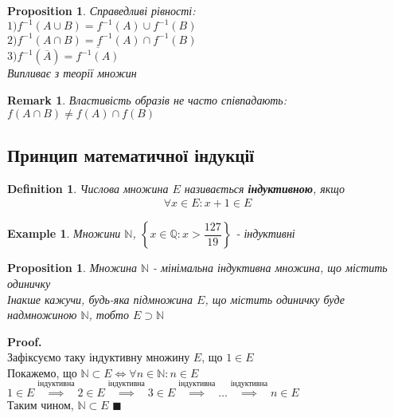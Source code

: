 \documentclass[a4paper, 14pt]{extarticle}
\theoremstyle{theoremdd}
\theoremstyle{theoremdd}
\newtheorem{definition}[theorem]{Definition}
\theoremstyle{theoremdd}
\theoremstyle{theoremdd}
\newtheorem{example}[theorem]{Example}
\theoremstyle{theoremdd}
\newtheorem{proposition}[theorem]{Proposition}
\theoremstyle{theoremdd}
\newtheorem{remark}[theorem]{Remark}
\theoremstyle{theoremdd}
\theoremstyle{theoremdd}
\newenvironment{pf}{\vspace*{-3mm} \textbf{Proof. \\}}{$\blacksquare$}
\begin{document}
\begin{proposition}
Справедливі рівності:\\
$1) f^{-1}(A \cup B) = f^{-1}(A) \cup f^{-1}(B)$\\
$2) f^{-1}(A \cap B) = f^{-1}(A) \cap f^{-1}(B)$\\
$3) f^{-1}(\overline{A}) = \overline{f^{-1}(A)}$\\
\textit{Випливає з теорії множин}
\end{proposition}

\begin{remark}
Властивість образів не часто співпадають:\\
$f(A \cap B) \neq f(A) \cap f(B)$
\end{remark}

\subsection{Принцип математичної індукції}
\begin{definition}
Числова множина $E$ називається \textbf{індуктивною}, якщо
\begin{align*}
\forall x \in E: x+1 \in E
\end{align*}
\end{definition}

\begin{example}
Множини $\mathbb{N}$, $\left\{x \in \mathbb{Q}: x > \dfrac{127}{19} \right\}$ - індуктивні
\end{example}
	
	\begin{proposition}
	Множина $\mathbb{N}$ - мінімальна індуктивна множина, що містить одиничку\\
	Інакше кажучи, будь-яка підмножина $E$, що містить одиничку буде надмножиною $\mathbb{N}$, тобто $E \supset \mathbb{N}$
	\end{proposition}
	\begin{pf}
	Зафіксуємо таку індуктивну множину $E$, що $1 \in E$\\
	Покажемо, що $\mathbb{N} \subset E \iff \forall n \in \mathbb{N}: n \in E$\\
	$1 \in E \overset{\textrm{індуктивна}}{\implies} 2 \in E \overset{\textrm{індуктивна}}{\implies} 3 \in E \overset{\textrm{індуктивна}}{\implies} \dots \overset{\textrm{індуктивна}}{\implies} n \in E$\\
	Таким чином, $\mathbb{N} \subset E$
	\end{pf}
	
\end{document}
